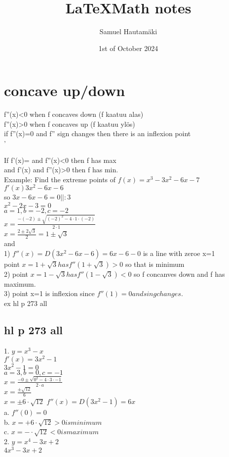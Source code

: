\documentclass{article}
\title{\LaTeX Math notes}
\author{Samuel Hautamäki}
\date{1st of October 2024}
\begin{document}
  \maketitle
   
  \section{concave up/down}
  f''(x)<0 when f concaves down (f kaatuu alas)\\
  f''(x)>0 when f concaves up (f kaatuu ylös)\\
  if f''(x)=0 and f'' sign changes then there is an inflexion point\\'
  
  If f'(x)= and f''(x)<0 then f has max\\
  and f'(x) and f''(x)>0 then f has min.\\

  Example: Find the extreme points of $f(x)=x^3-3x^2-6x-7$\\
  $f'(x)3x^2-6x-6$\\
  so $3x-6x-6=0 ||:3$\\
  $x^2-2x-3=0$\\
  $a=1,b=-2,c=-2$\\
  $x=\frac{-(-2)\pm\sqrt{(-2)^2-4\cdot1\cdot(-2)}}{2\cdot1}$\\
  $x=\frac{2\pm2\sqrt{3}}{2}=1\pm\sqrt{3}$\\
  and\\
  1) $f''(x)=D(3x^2-6x-6)=6x-6-0$ is a line with zeroe x=1\\
  point $x=1+\sqrt{3} has f''(1+\sqrt{3})>0$ so that is minimum\\
  2) point $x=1-\sqrt{3} has f''(1-\sqrt{3})<0$ so f concanves down and f has maximum.\\
  3) point x=1 is inflexion since $f''(1)=0 and sing changes.$\\
  ex hl p 273 all
  \subsection{hl p 273 all}
  1. $y=x^3-x$\\
  $f'(x)=3x^2-1$\\
  $3x^2-1=0$\\
  $a=3,b=0,c=-1$\\
  $x=\frac{-0\pm\sqrt{0^2-4\cdot 3\cdot -1}}{2\cdot a}$\\
  $x=\frac{\pm\sqrt{12}}{6}$\\
  $x=\pm6\cdot\sqrt{12}$
  $f''(x)=D(3x^2-1)=6x$\\
  a. $f''(0)=0$\\
  b. $x=+6\cdot\sqrt{12}>0 is minimum$\\
  c. $x=-\cdot\sqrt{12}<0 is maximum$\\
  2. $y=x^4-3x+2$\\
  $4x^3-3x+2$\\
  

  
  


  

   
\end{document}
